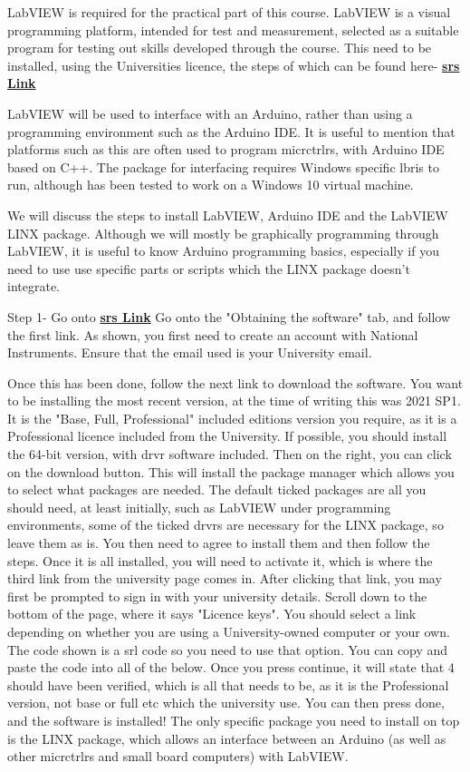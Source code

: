 \documentclass[a4paper,11pt]{report}
\let\oldhref\href %
\renewcommand{\href}[2]{\oldhref{#1}{\bf\gls{srs} #2}}
\begin{document}
LabVIEW is required for the practical part of this course. LabVIEW is a visual programming platform, intended for test and measurement, selected as a suitable program for testing out skills developed through the course. This need to be installed, using the Universities licence, the steps of which can be found here- \href{https://www.york.ac.uk/it-services/software/a-z/labview/}{Link}

LabVIEW will be used to interface with an Arduino, rather than using a programming environment such as the Arduino IDE. It is useful to mention that platforms such as this are often used to program \gls{micrctrlr}s, with Arduino IDE based on C++. The package for interfacing requires Windows specific \gls{lbris} to run, although has been tested to work on a Windows 10 virtual machine.

We will discuss the steps to install LabVIEW, Arduino IDE and the LabVIEW LINX package. Although we will mostly be graphically programming through LabVIEW, it is useful to know Arduino programming basics, especially if you need to use use specific parts or scripts which the LINX package doesn't integrate.

Step 1- Go onto \href{https://www.york.ac.uk/it-services/software/a-z/labview/}{Link}
Go onto the "Obtaining the software" tab, and follow the first link. As shown, you first need to create an account with National Instruments. Ensure that the email used is your University email.

Once this has been done, follow the next link to download the software. You want to be installing the most recent version, at the time of writing this was 2021 SP1. It is the "Base, Full, Professional" included editions version you require, as it is a Professional licence included from the University. If possible, you should install the 64-bit version, with \gls{drvr} software included. Then on the right, you can click on the download button. This will install the package manager which allows you to select what packages are needed. The default ticked packages are all you should need, at least initially, such as LabVIEW under programming environments, some of the ticked \gls{drvr}s are necessary for the LINX package, so leave them as is. You then need to agree to install them and then follow the steps. Once it is all installed, you will need to activate it, which is where the third link from the university page comes in. After clicking that link, you may first be prompted to sign in with your university details. Scroll down to the bottom of the page, where it says "Licence keys". You should select a link depending on whether you are using a University-owned computer or your own. The code shown is a \gls{srl} code so you need to use that option. You can copy and paste the code into all of the below. Once you press continue, it will state that 4 should have been verified, which is all that needs to be, as it is the Professional version, not base or full etc which the university use. You can then press done, and the software is installed! The only specific package you need to install on top is the LINX package, which allows an interface between an Arduino (as well as other \gls{micrctrlr}s and small board computers) with LabVIEW.
\end{document}
